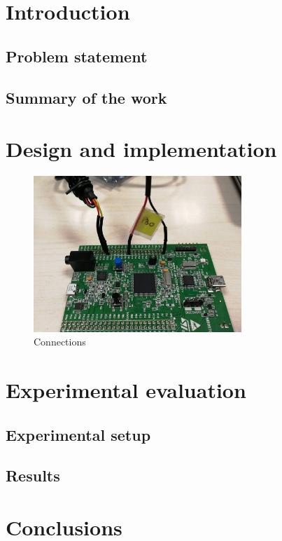 \section{Introduction}

\subsection{Problem statement}

\subsection{Summary of the work}


\section{Design and implementation}
\cite{RefManual}
\begin{figure}[htbp]
  \centering
     \includegraphics[width=0.7\textwidth]{./figures/connections.jpg}
  \caption{Connections}
  \label{fig:connections}
\end{figure}

\section{Experimental evaluation}
\subsection{Experimental setup}
\subsection{Results}



\section{Conclusions}

